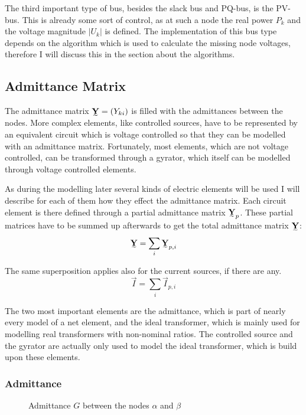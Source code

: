 The third important type of bus, besides the slack bus and PQ-bus, is the PV-bus. This is already some sort of control, as at such a node the real power $P_k$ and the voltage magnitude $|U_k|$ is defined. The implementation of this bus type depends on the algorithm which is used to calculate the missing node voltages, therefore I will discuss this in the section about the algorithms.

\subsection{Admittance Matrix}

The admittance matrix $\mat Y = (Y_{ki})$ is filled with the admittances between the nodes. More complex elements, like controlled sources, have to be represented by an equivalent circuit which is voltage controlled so that they can be modelled with an admittance matrix. Fortunately, most elements, which are not voltage controlled, can be transformed through a gyrator, which itself can be modelled through voltage controlled elements.

As during the modelling later several kinds of electric elements will be used I will describe for each of them how they effect the admittance matrix. Each circuit element is there defined through a partial admittance matrix $\mat Y_p$. These partial matrices have to be summed up afterwards to get the total admittance matrix $\mat Y$:
\begin{equation}
	\mat Y = \sum_i \mat Y_{p,i}
\end{equation}

The same superposition applies also for the current sources, if there are any.
\begin{equation}
	\vec I = \sum_i \vec I_{p,i}
\end{equation}

The two most important elements are the admittance, which is part of nearly every model of a net element, and the ideal transformer, which is mainly used for modelling real transformers with non-nominal ratios. The controlled source and the gyrator are actually only used to model the ideal transformer, which is build upon these elements.

\subsubsection{Admittance}

\begin{figure}
	\centering
	
	\caption{Admittance $G$ between the nodes $\alpha$ and $\beta$}
	\label{fig:admittance}
\end{figure}

